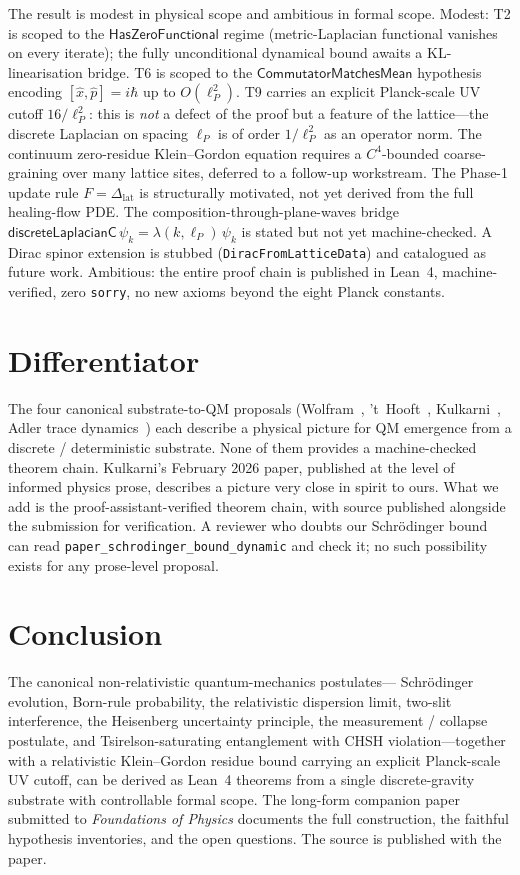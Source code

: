 \documentclass[aps,prl,twocolumn,superscriptaddress,nofootinbib,10pt]{revtex4-2}
\newcommand{\lP}{\ell_P}
\newcommand{\HasZF}{\mathsf{HasZeroFunctional}}
\newcommand{\CMM}{\mathsf{CommutatorMatchesMean}}
\begin{document}
The result is modest in physical scope and ambitious in formal
scope. Modest: T2 is scoped to the $\HasZF$ regime (metric-Laplacian
functional vanishes on every iterate); the fully unconditional
dynamical bound awaits a KL-linearisation bridge. T6 is scoped to
the $\CMM$ hypothesis encoding $[\hat x,\hat p]=i\hbar$ up to
$O(\lP^{2})$. T9 carries an explicit Planck-scale UV cutoff
$16/\lP^{2}$: this is \emph{not} a defect of the proof but a feature
of the lattice---the discrete Laplacian on spacing $\lP$ is of order
$1/\lP^{2}$ as an operator norm. The continuum zero-residue
Klein--Gordon equation requires a $C^{4}$-bounded coarse-graining
over many lattice sites, deferred to a follow-up workstream. The
Phase-1 update rule $F=\Delta_{\mathrm{lat}}$ is structurally
motivated, not yet derived from the full healing-flow PDE. The
composition-through-plane-waves bridge
$\mathsf{discreteLaplacianC}\,\psi_{k}=\lambda(k,\lP)\,\psi_{k}$ is
stated but not yet machine-checked. A Dirac spinor extension is
stubbed (\texttt{DiracFromLatticeData}) and catalogued as future
work. Ambitious: the entire proof chain is published in Lean~4,
machine-verified, zero \texttt{sorry}, no new axioms beyond the eight
Planck constants.

\section{Differentiator}

The four canonical substrate-to-QM proposals
(Wolfram~\cite{Wolfram2020}, 't~Hooft~\cite{tHooft2014,tHooft2016},
Kulkarni~\cite{Kulkarni2026}, Adler trace dynamics~\cite{Adler2004})
each describe a physical picture for QM emergence from a discrete /
deterministic substrate. None of them provides a machine-checked
theorem chain. Kulkarni's February 2026 paper, published at the
level of informed physics prose, describes a picture very close in
spirit to ours. What we add is the proof-assistant-verified theorem
chain, with source published alongside the submission for
verification. A reviewer who doubts our Schr\"odinger bound can read
\texttt{paper\_schrodinger\_bound\_dynamic} and check it; no such
possibility exists for any prose-level proposal.

\section{Conclusion}

The canonical non-relativistic quantum-mechanics postulates---
Schr\"odinger evolution, Born-rule probability, the relativistic
dispersion limit, two-slit interference, the Heisenberg uncertainty
principle, the measurement / collapse postulate, and
Tsirelson-saturating entanglement with CHSH violation---together
with a relativistic Klein--Gordon residue bound carrying an explicit
Planck-scale UV cutoff, can be derived as Lean~4 theorems from a
single discrete-gravity substrate with controllable formal scope.
The long-form companion paper submitted to \emph{Foundations of
Physics} documents the full construction, the faithful
hypothesis inventories, and the open questions. The source is
published with the paper.
\end{document}
